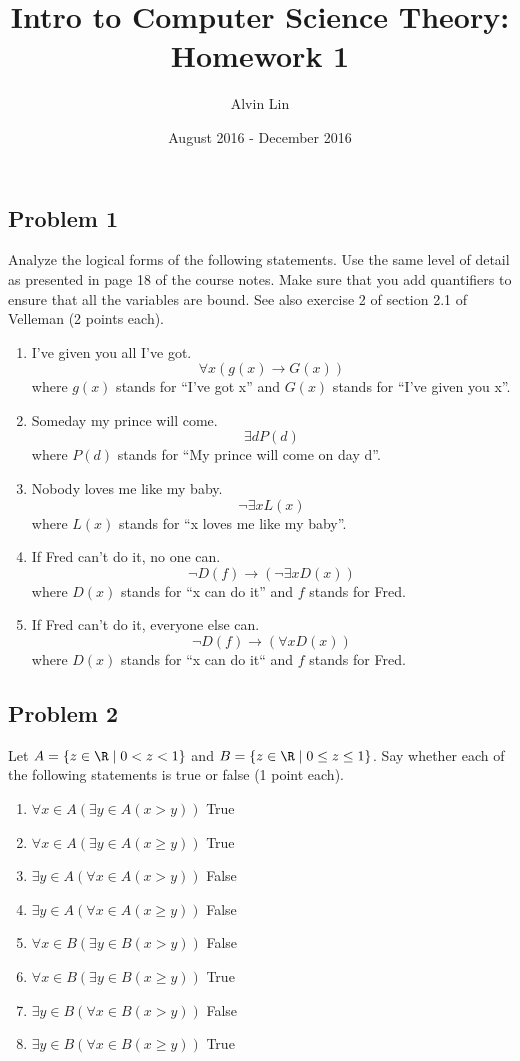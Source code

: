 \documentclass[letterpaper, 12pt]{math}
\title{Intro to Computer Science Theory: Homework 1}
\author{Alvin Lin}
\date{August 2016 - December 2016}
\begin{document}
\maketitle

\subsection*{Problem 1}
Analyze the logical forms of the following statements. Use the same level of
detail as presented in page 18 of the course notes. Make sure that you add
quantifiers to ensure that all the variables are bound. See also exercise 2 of
section 2.1 of Velleman (2 points each).
\begin{enumerate}
  \item I've given you all I've got.
    \[ \forall{x}(g(x)\to G(x)) \]
    where \( g(x) \) stands for ``I've got x'' and \( G(x) \) stands for ``I've
    given you x''.
  \item Someday my prince will come.
    \[ \exists{d}P(d) \]
    where \( P(d) \) stands for ``My prince will come on day d''.
  \item Nobody loves me like my baby.
    \[ \neg\exists{x}L(x) \]
    where \( L(x) \) stands for ``x loves me like my baby''.
  \item If Fred can't do it, no one can.
    \[ \neg D(f)\to(\neg\exists{x}D(x)) \]
    where \( D(x) \) stands for ``x can do it'' and \( f \) stands for Fred.
  \item If Fred can't do it, everyone else can.
    \[ \neg D(f)\to(\forall{x}D(x)) \]
    where \( D(x) \) stands for ``x can do it`` and \( f \) stands for Fred.
\end{enumerate}

\subsection*{Problem 2}
Let \( A = \{z\in\R \mid 0 < z < 1\} \) and \( B = \{z\in\R \mid 0 \le z \le
1\} \). Say whether each of the following statements is true or false (1 point
each).
\begin{enumerate}
  \item \( \forall{x}\in A(\exists{y}\in A(x > y)) \) True
  \item \( \forall{x}\in A(\exists{y}\in A(x \ge y)) \) True
  \item \( \exists{y}\in A(\forall{x}\in A(x > y)) \) False
  \item \( \exists{y}\in A(\forall{x}\in A(x \ge y)) \) False
  \item \( \forall{x}\in B(\exists{y}\in B(x > y)) \) False
  \item \( \forall{x}\in B(\exists{y}\in B(x \ge y)) \) True
  \item \( \exists{y}\in B(\forall{x}\in B(x > y)) \) False
  \item \( \exists{y}\in B(\forall{x}\in B(x \ge y)) \) True
\end{enumerate}
\end{document}

